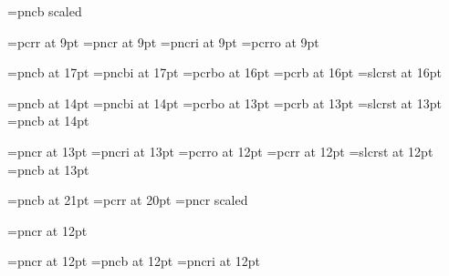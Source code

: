 \font{}=pncb scaled  %

\font\ninett=pcrr at 9pt
\let\indtt=\ninett
\font\indrm=pncr at 9pt
\font\indit=pncri at 9pt
\font\indsl=pcrro at 9pt
\let\indsf=\indrm
\let\indbf=\indrm
\let\indsc=\indrm

\font\chaprm=pncb at 17pt
\font\chapit=pncbi at 17pt
\font\chapsl=pcrbo at 16pt
\font\chaptt=pcrb at 16pt
\font\chapsf=slcrst at 16pt
\let\chapbf=\chaprm
\def\chapfonts{\baselineskip=19pt%
  \let\tenrm=\chaprm \let\tenit=\chapit \let\tensl=\chapsl 
  \let\tenbf=\chapbf \let\tentt=\chaptt \let\smallcaps=\chapsc
  \let\tensf=\chapsf \let\teni=\chapi \let\tensy=\chapsy
  \resetmathfonts}


\font\secrm=pncb at 14pt
\font\secit=pncbi at 14pt
\font\secsl=pcrbo at 13pt
\font\sectt=pcrb at 13pt
\font\secsf=slcrst at 13pt
\font\secbf=pncb at 14pt

\font\ssecrm=pncr at 13pt
\font\ssecit=pncri at 13pt
\font\ssecsl=pcrro at 12pt
\font\ssectt=pcrr at 12pt
\font\ssecsf=slcrst at 12pt
\font\ssecbf=pncb at 13pt

\font\titlerm=pncb at 21pt
\font\titlett=pcrr at 20pt
\font\authorrm=pncr scaled 

\font\truesecrm=pncr at 12pt

\font\shortcontrm=pncr at 12pt 
\font\shortcontbf=pncb at 12pt 
\font\shortcontsl=pncri at 12pt

\def\smartitalicx{\ifx\next,\else\ifx\next-\else\ifx\next.\else\/\fi\fi\fi}
\def\smartitalic#1{{\it #1}\futurelet\next\smartitalicx}
%
\def\smartslantx{\ifx\next,\else\ifx\next-\else\ifx\next.\else\/\fi\fi\fi}
\def\smartslant#1{{\sl #1}\futurelet\next\smartslantx}

\let\i=\smartitalic
\let\var=\smartslant
\let\dfn=\smartitalic
\let\emph=\smartitalic
\let\cite=\smartitalic


